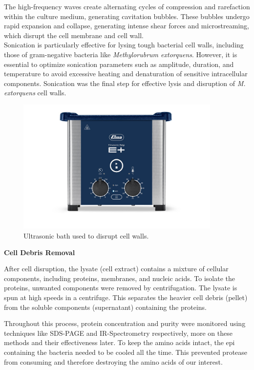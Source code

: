 \begin{itemize}
    The high-frequency waves create alternating cycles of compression and rarefaction within the culture medium, generating cavitation bubbles.
    These bubbles undergo rapid expansion and collapse, generating intense shear forces and
    microstreaming, which disrupt the cell membrane and cell wall. \\
    Sonication is particularly effective for lysing tough bacterial cell walls, including those of gram-negative bacteria like \emph{Methylorubrum extorquens}.
    However, it is essential to optimize sonication parameters such as amplitude, duration, and temperature to avoid excessive heating and denaturation of sensitive intracellular components.
    Sonication was the final step for effective lysis and disruption of \emph{M. extorquens} cell walls.
    \begin{figure}[H]
        \centering
        \includegraphics[width=0.9\textwidth]{./media/images/ultrasonic_bath}
        \caption{Ultrasonic bath used to disrupt cell walls.}
        \label{fig:ultrasonic_bath}
    \end{figure}
\end{itemize}

\textbf{Cell Debris Removal}

After cell disruption, the lysate (cell extract) contains a mixture of cellular components,
including proteins, membranes, and nucleic acids.
To isolate the proteins, unwanted components were removed by centrifugation.
The lysate is spun at high speeds in a centrifuge.
This separates the heavier cell debris (pellet) from the soluble components
(supernatant) containing the proteins.

Throughout this process, protein concentration and purity were monitored using techniques
like SDS-PAGE and IR-Spectrometry respectively, more on these methods and their
effectiveness later.
To keep the amino acids intact, the epi containing the bacteria needed to be cooled all the time.
This prevented protease from consuming and therefore destroying the amino acids of our interest.

